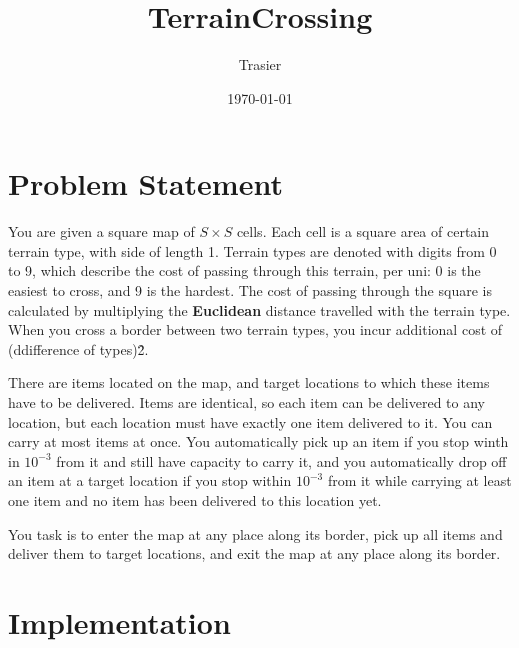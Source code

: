 \documentclass[hyperref,UTF8]{ctexart}
\theoremstyle{definition}
\theoremstyle{remark}
\numberwithin{equation}{subsection}
\newcommand{\Emph}{\textbf}
\begin{document}
\title{\Huge TerrainCrossing}
\vspace{2cm}
\author{\Large Trasier}
\date{\today}
\maketitle

\section{Problem Statement}
\label{sec:prob_statement}

	You are given a square map of $S \times S$ cells. Each cell is a square area of certain terrain type, with side of length 1.
	Terrain types are denoted with digits from 0 to 9, which describe the cost of passing through this terrain, per uni:
	0 is the easiest to cross, and 9 is the hardest. The cost of passing through the square is calculated by multiplying the
	\Emph{Euclidean} distance travelled with the terrain type. When you cross a border between two terrain types, you incur additional
	cost of (ddifference of types)\^2.
	
	
	There are  items located on the map, and  target locations to which these items have to be delivered.
	Items are identical, so each item can be delivered to any location, but each location must have exactly one item delivered to it.
	You can carry at most  items at once. You automatically pick up an item if you stop winth in $10^{-3}$ from it and
	still have capacity to carry it, and you automatically drop off an item at a target location if you stop within $10^{-3}$ from it while
	carrying at least one item and no item has been delivered to this location yet.
	
	
	You task is to enter the map at any place along its border, pick up all items and deliver them to target locations, and exit the map
	at any place along its border.

\section{Implementation}	
\label{sec:Implementation}
\end{document}
